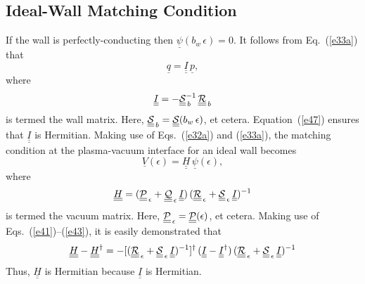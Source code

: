 \documentclass[12pt,prb,aps,notitlepage]{revtex4-1}
\begin{document}
\subsection{Ideal-Wall Matching Condition}
If the wall is perfectly-conducting then  $\underline{\psi}(b_w\,\epsilon)=0$. 
It follows from Eq.~(\ref{e33a}) that
\begin{equation}
\underline{q} = \underline{\underline{I}}\,\underline{p},
\end{equation}
where
\begin{equation}
 \underline{\underline{I}}=- \underline{\underline{\cal S}}_{\,b}^{-1}\,\underline{\underline{\cal R}}_{\,b}
 \end{equation}
 is termed the wall matrix.
 Here, $\underline{\underline{\cal S}}_{\,b}= \underline{\underline{\cal S}}(b_w\,\epsilon)$, et cetera. Equation~(\ref{e47}) ensures that $ \underline{\underline{I}}$
 is Hermitian. 
  Making use of Eqs.~(\ref{e32a}) and (\ref{e33a}),  the matching condition at the plasma-vacuum interface  for an ideal wall becomes 
 \begin{equation}
 \underline{V}(\epsilon)= \underline{\underline{H}}\,\underline{\psi}(\epsilon),
 \end{equation}
 where 
 \begin{equation}
 \underline{\underline{H}}= (\underline{\underline{\cal P}}_{\,\epsilon}+\underline{\underline{\cal Q}}_{\,\epsilon}\,\underline{\underline{I}})\,(\underline{\underline{\cal R}}_{\,\epsilon}+\underline{\underline{\cal S}}_{\,\epsilon}\,\underline{\underline{I}})^{-1}
 \end{equation}
 is termed the vacuum matrix. 
  Here, $\underline{\underline{\cal P}}_{\,\epsilon}= \underline{\underline{\cal P}}(\epsilon)$, et cetera. 
Making use of Eqs.~(\ref{e41})--(\ref{e43}), it is easily demonstrated that
 \begin{equation}\label{e53}
 \underline{\underline{H}}-\underline{\underline{H}}^\dag =- [(\underline{\underline{\cal R}}_{\,\epsilon}+\underline{\underline{\cal S}}_{\,\epsilon}\,\underline{\underline{I}})^{-1}]^{\dag}\,(\underline{\underline{I}} -\underline{\underline{I}}^\dag)\,  (\underline{\underline{\cal R}}_{\,\epsilon}+\underline{\underline{\cal S}}_{\,\epsilon}\,\underline{\underline{I}})^{-1}
\end{equation}
Thus,  $\underline{\underline{H}}$ is Hermitian because  $\underline{\underline{I}}$ is Hermitian. 
 
\end{document}
